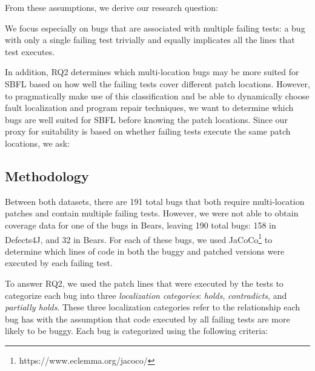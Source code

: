 \documentclass[10pt, conference]{IEEEtran}
\begin{document}
From these assumptions, we derive our research question: 


We focus especially on bugs that are associated with multiple failing tests: a bug
with only a single failing test trivially and equally implicates all the lines
that test executes. 


In addition, RQ2 determines which multi-location bugs may be more suited for SBFL 
based on how well the failing tests cover different patch locations. However, to pragmatically 
make use of this classification and be able to dynamically choose fault localization and program 
repair techniques, we want to determine which bugs are well suited for SBFL before knowing 
the patch locations. Since our proxy for suitability is based on whether failing tests execute 
the same patch locations, we ask:


\subsection{Methodology}

Between both datasets, there are 191 total bugs that both require multi-location
patches and contain multiple failing tests. However, we were not able to obtain coverage 
data for one of the bugs in Bears, leaving 190 total bugs: 158 in Defects4J, and 32 in
Bears. 
For each of these bugs, we used JaCoCo\footnote{https://www.eclemma.org/jacoco/}
to determine which lines of code in both the buggy and patched versions were executed
by each failing test.

To answer RQ2, we used the patch lines that were executed by the tests to categorize 
each bug into three \emph{localization categories}: \emph{holds}, \emph{contradicts}, and 
\emph{partially holds}. These three localization categories refer to the relationship each bug has 
with 
the assumption that code executed by all failing tests are more likely to be buggy. Each bug is 
categorized using the following criteria:
\end{document}
